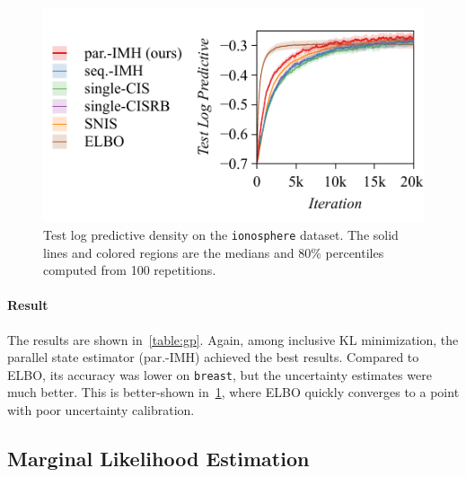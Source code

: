 %
\begin{figure}[H]
  \centering
     \includegraphics[scale=0.8]{figures/ionosphere_01.pdf}
     \vspace{-0.1in}
  \caption{Test log predictive density on the \texttt{ionosphere} dataset.
    The solid lines and colored regions are the medians and 80\% percentiles computed from 100 repetitions.
  }\label{fig:gp}
  \vspace{-0.1in}
\end{figure}
%
\vspace{-0.05in}
\paragraph{Result}
The results are shown in~\cref{table:gp}.
Again, among inclusive KL minimization, the parallel state estimator (par.-IMH) achieved the best results.
Compared to ELBO, its accuracy was lower on \texttt{breast}, but the uncertainty estimates were much better.
This is better-shown in~\cref{fig:gp}, where ELBO quickly converges to a point with poor uncertainty calibration.

  \vspace{-0.05in}
\subsection{Marginal Likelihood Estimation}\label{section:mll}
  \vspace{-0.05in}
